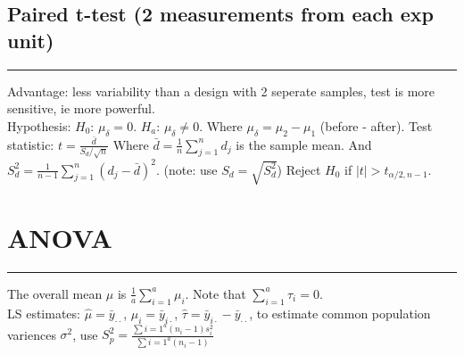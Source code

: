 \documentclass[10pt]{article}
\begin{document}
\subsection*{Paired t-test (2 measurements from each exp unit)}
\hrule width 11cm
\vspace{6pt}
Advantage: less variability than a design with 2 seperate samples, test is more sensitive, ie more powerful. \\
Hypothesis: $H_0$: $\mu_{\delta} = 0$. $H_a$: $\mu_{\delta} \neq 0$. Where $\mu_{\delta} = \mu_2 - \mu_1$ (before - after).
Test statistic: $t = \frac{\bar{d}}{S_d / \sqrt{n}}$ Where $\bar{d} = \frac{1}{n}\sum_{j=1}^{n}d_j$ is the sample mean.
And $S_d^2 = \frac{1}{n-1} \sum_{j=1}^{n}(d_j - \bar{d})^2$. (note: use $S_d = \sqrt{S_d^2}$) Reject $H_0$ if $\left| t \right| > t_{\alpha/2, n-1}$.

\section*{ANOVA}
\hrule width 10cm
\vspace{6pt}
The overall mean $\mu$ is $\frac{1}{a} \sum_{i=1}^{a} \mu_i$. Note that $\sum_{i=1}^{a}\tau_i = 0$. \\
LS estimates: $\hat{\mu} = \bar{y}_{\cdot \cdot}$, $\hat{\mu}_i = \bar{y}_{i \cdot}$, $\hat{\tau} = \bar{y}_{i \cdot} - \bar{y}_{\cdot \cdot}$, to estimate common population variences $\sigma^2$, use $S_p^2 = \frac{\sum{i=1}^{a}(n_i - 1)s_i^2}{\sum{i=1}^{a}(n_i -1)}$
\end{document}

